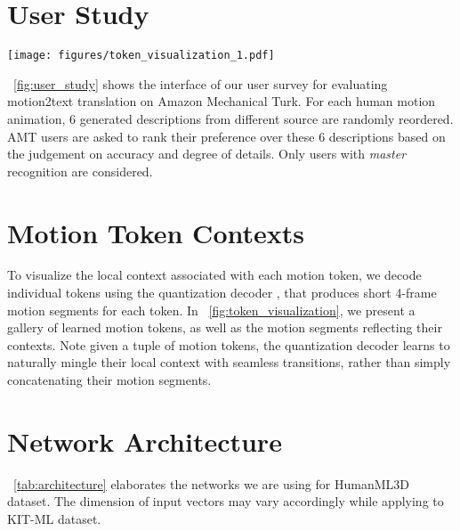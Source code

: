 \documentclass[runningheads]{llncs}
\newcommand{\beforefigcaption}{\vspace{-9mm}}
\newcommand{\afterfigcaption}{\vspace{-5mm}}
\newcommand{\beforesection}{\vspace{-2mm}}
\newcommand{\aftersection}{\vspace{-2mm}}
\begin{document}
\section{User Study}
\aftersection

\begin{figure*}[t]
	\centering
	\texttt{[image: figures/token\_visualization\_1.pdf]}
		 \beforefigcaption
	\caption{Exemplar motion tokens and their associated local spatial-temporal contexts, visualized in 4-frame motion segments.} 
	\label{fig:token_visualization}
	 \afterfigcaption
\end{figure*}

~\cref{fig:user_study} shows the interface of our user survey for evaluating motion2text translation on Amazon Mechanical Turk. For each human motion animation, 6 generated descriptions from different source are randomly reordered. AMT users are asked to rank their preference over these 6 descriptions based on the judgement on accuracy and degree of details. Only users with \textit{master} recognition are considered.
\beforesection
\section{Motion Token Contexts}
\aftersection
To visualize the local context associated with each motion token, we decode individual tokens using the quantization decoder , that produces short 4-frame motion segments for each token. In ~\cref{fig:token_visualization}, we present a gallery of learned motion tokens, as well as the motion segments reflecting their contexts. Note given a tuple of motion tokens, the quantization decoder  learns to naturally mingle their local context with seamless transitions, rather than simply concatenating their motion segments. 

\beforesection
\section{Network Architecture}
\aftersection
~\cref{tab:architecture} elaborates the networks we are using for HumanML3D dataset. The dimension of input vectors may vary accordingly while applying to KIT-ML dataset.
\end{document}
